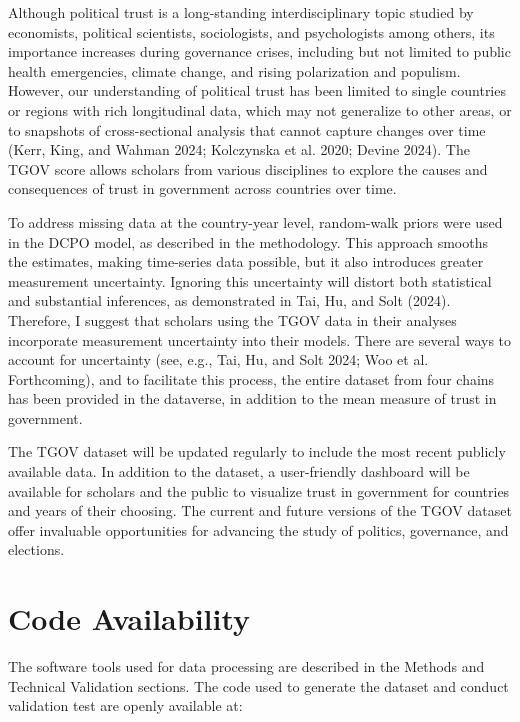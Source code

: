 \documentclass[
  12pt,
]{article}
\begin{document}
Although political trust is a long-standing interdisciplinary topic studied by economists, political scientists, sociologists, and psychologists among others, its importance increases during governance crises, including but not limited to public health emergencies, climate change, and rising polarization and populism.
However, our understanding of political trust has been limited to single countries or regions with rich longitudinal data, which may not generalize to other areas, or to snapshots of cross-sectional analysis that cannot capture changes over time (Kerr, King, and Wahman 2024; Kolczynska et al. 2020; Devine 2024).
The TGOV score allows scholars from various disciplines to explore the causes and consequences of trust in government across countries over time.

To address missing data at the country-year level, random-walk priors were used in the DCPO model, as described in the methodology.
This approach smooths the estimates, making time-series data possible, but it also introduces greater measurement uncertainty.
Ignoring this uncertainty will distort both statistical and substantial inferences, as demonstrated in Tai, Hu, and Solt (2024).
Therefore, I suggest that scholars using the TGOV data in their analyses incorporate measurement uncertainty into their models.
There are several ways to account for uncertainty (see, e.g., Tai, Hu, and Solt 2024; Woo et al. Forthcoming), and to facilitate this process, the entire dataset from four chains has been provided in the dataverse, in addition to the mean measure of trust in government.

The TGOV dataset will be updated regularly to include the most recent publicly available data.
In addition to the dataset, a user-friendly dashboard will be available for scholars and the public to visualize trust in government for countries and years of their choosing.
The current and future versions of the TGOV dataset offer invaluable opportunities for advancing the study of politics, governance, and elections.

\section{Code Availability}\label{code-availability}

The software tools used for data processing are described in the Methods and Technical Validation sections.
The code used to generate the dataset and conduct validation test are openly available at:
\end{document}
